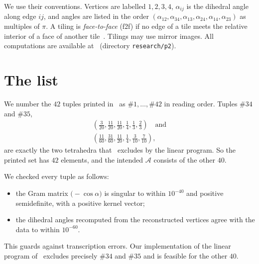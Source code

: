 \documentclass[11pt]{amsart}
\theoremstyle{definition}
\newcommand{\cA}{\mathscr{A}}
\begin{document}
We use their conventions. Vertices are labelled $1,2,3,4$, $\alpha_{ij}$ is the dihedral angle along edge $ij$, and
angles are listed in the order $(\alpha_{12},\alpha_{34},\alpha_{13},\alpha_{24},\alpha_{14},\alpha_{23})$ as multiples
of $\pi$. A tiling is \emph{face-to-face} (f2f) if no edge of a tile meets the relative interior of a face of another
tile~\cite[Def.~2.2]{CS}. Tilings may use mirror images. All computations are available at~\cite{code}
(directory \texttt{research/p2}).

\section{The list}
We number the $42$ tuples printed in~\cite[Thm.~1.2]{CS} as $\#1,\dots,\#42$ in reading order. Tuples $\#34$ and $\#35$,
\begin{gather*}(\tfrac{3}{20},\tfrac{11}{20},\tfrac{11}{20},\tfrac14,\tfrac13,\tfrac23)\quad\text{and}\\
(\tfrac{11}{60},\tfrac{31}{60},\tfrac{11}{20},\tfrac14,\tfrac{3}{10},\tfrac{7}{10}),\end{gather*}
are exactly the two tetrahedra that~\cite[§3.1, eq.~(5)]{CS} excludes by the linear program. So the printed set has $42$
elements, and the intended $\cA$ consists of the other $40$.

We checked every tuple as follows:
\begin{itemize}[leftmargin=1.5em]
\item the Gram matrix $\bigl(-\cos\alpha\bigr)$ is singular to within $10^{-40}$ and positive semidefinite, with a positive
kernel vector;
\item the dihedral angles recomputed from the reconstructed vertices agree with the data to within $10^{-60}$.
\end{itemize}
This guards against transcription errors. Our implementation of the linear program of~\cite[Cor.~2.13]{CS} excludes precisely
$\#34$ and $\#35$ and is feasible for the other $40$.
\end{document}
